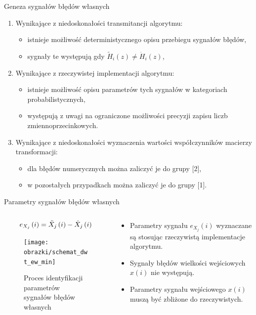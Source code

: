 \documentclass[12pt, polish, aspectratio = 169]{slides}
\begin{document}
\begin{frame}{Geneza sygnałów błędów własnych}
\begin{enumerate}
\item Wynikające z niedoskonałości transmitancji algorytmu:
	\begin{itemize}
	\item istnieje możliwość deterministycznego opisu przebiegu sygnałów błędów,
	\item sygnały te występują gdy $\tilde{H}_{i}(z) \ne \dot{H}_{i}(z)$,
	\end{itemize}
\item Wynikające z rzeczywistej implementacji algorytmu:
	\begin{itemize}
	\item istnieje możliwość opisu parametrów tych sygnałów w kategoriach probabilistycznych,
	\item występują z uwagi na ograniczone możliwości precyzji zapisu liczb zmiennoprzecinkowych.
	\end{itemize}
\item Wynikające z niedoskonałości wyznaczenia wartości współczynników macierzy transformacji:
	\begin{itemize}
	\item dla błędów numerycznych można zaliczyć je do grupy [2],
	\item w pozostałych przypadkach można zaliczyć je do grupy [1].
	\end{itemize}
\end{enumerate}
\end{frame}

\begin{frame}{Parametry sygnałów błędów własnych}
\begin{columns}
\begin{column}{0.6\textwidth}
	\begin{equation}
	e_{X_{j}}\left(i\right) = \tilde{X}_{j}\left(i\right) - \dot{X}_{j}\left(i\right) \label{eq:dwt_round_error}
	\end{equation}
	\begin{figure}
	\texttt{[image: obrazki/schemat\_dwt\_ew\_min]}
	\caption{Proces identyfikacji parametrów sygnałów błędów własnych}
	\end{figure}
\end{column}
\begin{column}{0.4\textwidth}
	\begin{itemize}
	\item Parametry sygnału $e_{X_{j}}(i)$ wyznaczane są stosując rzeczywistą implementacje algorytmu.
	\item Sygnały błędów wielkości wejściowych $x(i)$ nie występują.
	\item Parametry sygnału wejściowego $x(i)$ muszą być zbliżone do rzeczywistych.
	\end{itemize}
\end{column}
\end{columns}
\end{frame}
\end{document}

